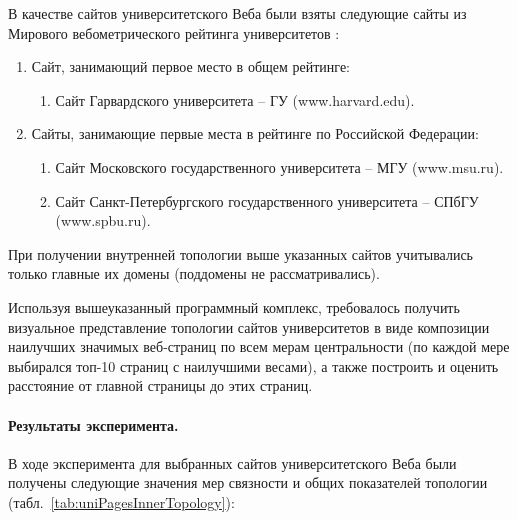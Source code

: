 В качестве сайтов университетского Веба были взяты следующие сайты из Мирового вебометрического рейтинга университетов \cite{RankingWeb}:
\begin{enumerate}
	\item Сайт, занимающий первое место в общем рейтинге:
		\begin{enumerate}
				\item Сайт Гарвардского университета -- ГУ (www.harvard.edu). 
			\end{enumerate}
	\item Сайты, занимающие первые места в рейтинге по Российской Федерации: 
		\begin{enumerate}
				\item Сайт Московского государственного университета -- МГУ (www.msu.ru). 
				\item Сайт Санкт-Петербургского государственного университета -- СПбГУ (www.spbu.ru).
			\end{enumerate}
\end{enumerate}

При получении внутренней топологии выше указанных сайтов учитывались только главные их домены (поддомены не рассматривались). 

Используя вышеуказанный программный комплекс, требовалось получить визуальное представление топологии сайтов университетов в виде композиции наилучших значимых веб-страниц по всем мерам центральности (по каждой мере выбирался топ-10 страниц с наилучшими весами), а также построить и оценить расстояние от главной страницы до этих страниц.

\paragraph{Результаты эксперимента.} В ходе эксперимента для выбранных сайтов университетского Веба были получены следующие значения мер связности и общих показателей топологии (табл.~\cref{tab:uniPagesInnerTopology}):

